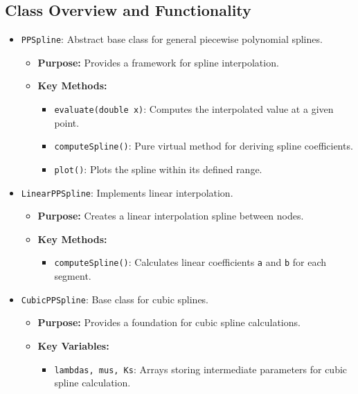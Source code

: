 \documentclass[a4paper]{article}
\begin{document}
\subsection{ Class Overview and Functionality}
\begin{itemize}
    \item \texttt{PPSpline}: Abstract base class for general piecewise polynomial splines.
    \begin{itemize}
        \item \textbf{Purpose:} Provides a framework for spline interpolation.
        \item \textbf{Key Methods:}
            \begin{itemize}
                \item \texttt{evaluate(double x)}: Computes the interpolated value at a given point.
                \item \texttt{computeSpline()}: Pure virtual method for deriving spline coefficients.
                \item \texttt{plot()}: Plots the spline within its defined range.
            \end{itemize}
    \end{itemize}
    \item \texttt{LinearPPSpline}: Implements linear interpolation.
    \begin{itemize}
        \item \textbf{Purpose:} Creates a linear interpolation spline between nodes.
        \item \textbf{Key Methods:}
            \begin{itemize}
                \item \texttt{computeSpline()}: Calculates linear coefficients \texttt{a} and \texttt{b} for each segment.
            \end{itemize}
    \end{itemize}
    \item \texttt{CubicPPSpline}: Base class for cubic splines.
    \begin{itemize}
        \item \textbf{Purpose:} Provides a foundation for cubic spline calculations.
        \item \textbf{Key Variables:}
            \begin{itemize}
                \item \texttt{lambdas, mus, Ks}: Arrays storing intermediate parameters for cubic spline calculation.
            \end{itemize}

\end{itemize}
\end{itemize}
\end{document}
